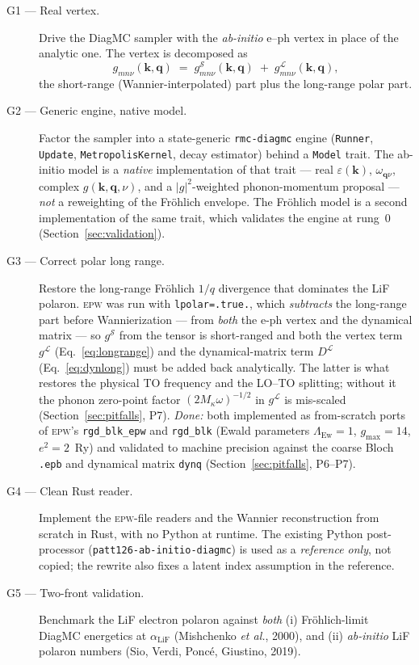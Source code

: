 \documentclass[11pt]{article}
\newcommand{\kv}{\mathbf{k}}
\newcommand{\qv}{\mathbf{q}}
\newcommand{\gshort}{g^{\mathcal{S}}}
\newcommand{\glong}{g^{\mathcal{L}}}
\newcommand{\Dlong}{D^{\mathcal{L}}}
\begin{document}
\begin{description}
  \item[G1 --- Real vertex.] Drive the DiagMC sampler with the \emph{ab-initio} e--ph
    vertex in place of the analytic one. The vertex is decomposed as
    \begin{equation}
      g_{mn\nu}(\kv,\qv) \;=\; \gshort_{mn\nu}(\kv,\qv)\;+\;\glong_{mn\nu}(\kv,\qv),
      \label{eq:split}
    \end{equation}
    the short-range (Wannier-interpolated) part plus the long-range polar part.

  \item[G2 --- Generic engine, native model.] Factor the sampler into a state-generic
    \texttt{rmc-diagmc} engine (\texttt{Runner}, \texttt{Update}, \texttt{MetropolisKernel},
    decay estimator) behind a \texttt{Model} trait. The ab-initio model is a \emph{native}
    implementation of that trait --- real $\varepsilon(\kv)$, $\omega_{\qv\nu}$, complex
    $g(\kv,\qv,\nu)$, and a $|g|^{2}$-weighted phonon-momentum proposal --- \emph{not} a
    reweighting of the Fr\"ohlich envelope. The Fr\"ohlich model is a second implementation of
    the same trait, which validates the engine at rung~0 (Section~\ref{sec:validation}).

  \item[G3 --- Correct polar long range.] Restore the long-range Fr\"ohlich
    $1/q$ divergence that dominates the LiF polaron. \textsc{epw} was run with
    \texttt{lpolar=.true.}, which \emph{subtracts} the long-range part before
    Wannierization --- from \emph{both} the e-ph vertex and the dynamical matrix --- so
    $\gshort$ from the tensor is short-ranged and both the vertex term $\glong$
    (Eq.~\eqref{eq:longrange}) and the dynamical-matrix term $\Dlong$
    (Eq.~\eqref{eq:dynlong}) must be added back analytically. The latter is what restores
    the physical TO frequency and the LO--TO splitting; without it the phonon zero-point
    factor $(2M_{\kappa}\omega)^{-1/2}$ in $\glong$ is mis-scaled (Section~\ref{sec:pitfalls},
    P7). \emph{Done:} both implemented as from-scratch ports of \textsc{epw}'s
    \texttt{rgd\_blk\_epw} and \texttt{rgd\_blk} (Ewald parameters $\Lambda_{\mathrm{Ew}}=1$,
    $g_{\max}=14$, $e^{2}=2$~Ry) and validated to machine precision against the coarse Bloch
    \texttt{.epb} and dynamical matrix \texttt{dynq} (Section~\ref{sec:pitfalls}, P6--P7).

  \item[G4 --- Clean Rust reader.] Implement the \textsc{epw}-file readers and the Wannier
    reconstruction from scratch in Rust, with no Python at runtime. The existing Python
    post-processor (\texttt{patt126-ab-initio-diagmc}) is used as a \emph{reference only},
    not copied; the rewrite also fixes a latent index assumption in the reference.

  \item[G5 --- Two-front validation.] Benchmark the LiF electron polaron against
    \emph{both}
    (i) Fr\"ohlich-limit DiagMC energetics at $\alpha_{\mathrm{LiF}}$
        (Mishchenko \emph{et al.}, 2000), and
    (ii) \emph{ab-initio} LiF polaron numbers
        (Sio, Verdi, Ponc\'e, Giustino, 2019).
\end{description}
\end{document}
